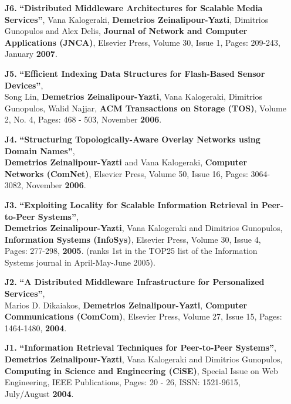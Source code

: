 \documentclass[10pt]{article}
\begin{document}
\begin{enumerate}
\item[{\bf J6.}] 
\label{J6}
{\bf ``Distributed Middleware Architectures for Scalable Media Services''},  
Vana Kalogeraki, {\bf Demetrios Zeinalipour-Yazti}, Dimitrios Gunopulos and Alex Delis,
{\bf Journal of Network and Computer Applications (JNCA)},  Elsevier Press,  
Volume 30, Issue 1, Pages: 209-243, January {\bf 2007}.  

\item [{\bf J5.}] 
\label{J5}
{\bf ``Efficient Indexing Data Structures for Flash-Based Sensor Devices''},\\
Song Lin, {\bf Demetrios Zeinalipour-Yazti}, Vana Kalogeraki, Dimitrios Gunopulos, Walid Najjar, 
{\bf ACM Transactions on Storage (TOS)}, Volume 2, No. 4, Pages: 468 - 503, November {\bf 2006}.

\item[{\bf J4.}] 
\label{J4} 
{\bf ``Structuring Topologically-Aware Overlay Networks using Domain Names''},\\
{\bf Demetrios Zeinalipour-Yazti} and Vana Kalogeraki,
{\bf Computer Networks (ComNet)},  Elsevier Press, Volume 50, Issue 16, Pages: 3064-3082, November {\bf 2006}.  

\item[{\bf J3.}] 
\label{J3}
{\bf ``Exploiting Locality for Scalable Information Retrieval in Peer-to-Peer Systems''},\\
{\bf Demetrios Zeinalipour-Yazti}, Vana Kalogeraki and Dimitrios Gunopulos, 
{\bf Information Systems (InfoSys)},  Elsevier Press,  Volume 30, Issue 4, Pages: 277-298, {\bf 2005}.
(ranks 1st in the TOP25 list of the Information Systems journal in April-May-June 2005).

\item[{\bf J2.}] 
\label{J2}
{\bf ``A Distributed Middleware Infrastructure for Personalized Services''},\\
Marios D. Dikaiakos, {\bf Demetrios Zeinalipour-Yazti}, 
{\bf Computer Communications (ComCom)}, Elsevier Press, Volume 27, Issue 15, Pages: 1464-1480, {\bf 2004}.

\item[{\bf J1.}] 
\label{J1}  
{\bf ``Information Retrieval Techniques for Peer-to-Peer Systems''}, \\
{\bf Demetrios Zeinalipour-Yazti}, Vana Kalogeraki and Dimitrios Gunopulos, 
{\bf Computing in Science and Engineering (CiSE)}, Special Issue on Web Engineering, IEEE Publications, Pages: 20 - 26, ISSN: 1521-9615, July/August {\bf 2004}.

\end{enumerate}
\end{document}
